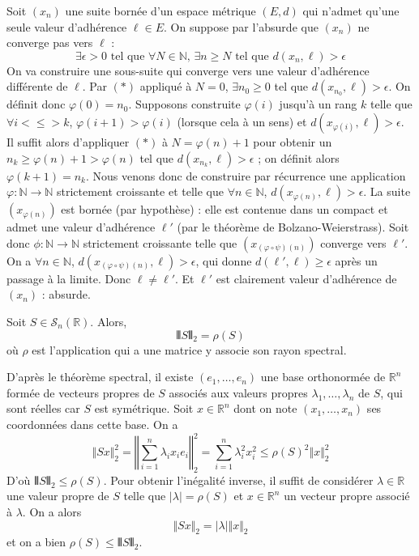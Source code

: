 	\begin{demonstration}
		Soit $(x_n)$ une suite bornée d'un espace métrique $(E, d)$ qui n'admet qu'une seule valeur d'adhérence $\ell \in E$. On suppose par l'absurde que $(x_n)$ ne converge pas vers $\ell$ :
		\[ \exists \epsilon > 0 \text{ tel que } \forall N \in \mathbb{N}, \, \exists n \geq N \text{ tel que } d(x_n, \ell) > \epsilon \tag{$*$} \]
		On va construire une sous-suite qui converge vers une valeur d'adhérence différente de $\ell$.
		\newpar
		Par $(*)$ appliqué à $N = 0$, $\exists n_0 \geq 0$ tel que $d(x_{n_0}, \ell) > \epsilon$. On définit donc $\varphi(0) = n_0$.
		\newpar
		Supposons construite $\varphi(i)$ jusqu'à un rang $k$ telle que $\forall i <\leq> k$, $\varphi(i+1) > \varphi(i)$ (lorsque cela à un sens) et $d(x_{\varphi(i)}, \ell) > \epsilon$. Il suffit alors d'appliquer $(*)$ à $N = \varphi(n) + 1$ pour obtenir un $n_k \geq \varphi(n) + 1 > \varphi(n)$ tel que $d(x_{n_k}, \ell) > \epsilon$ ; on définit alors $\varphi(k+1) = n_k$.
		\newpar
		Nous venons donc de construire par récurrence une application $\varphi : \mathbb{N} \rightarrow \mathbb{N}$ strictement croissante et telle que $\forall n \in \mathbb{N}$, $d(x_{\varphi(n)}, \ell) > \epsilon$. La suite $(x_{\varphi(n)})$ est bornée (par hypothèse) : elle est contenue dans un compact et admet une valeur d'adhérence $\ell'$ (par le théorème de Bolzano-Weierstrass). Soit donc $\phi : \mathbb{N} \rightarrow \mathbb{N}$ strictement croissante telle que $(x_{(\varphi \circ \psi)(n)})$ converge vers $\ell'$.
		\newpar
		On a $\forall n \in \mathbb{N}$, $d(x_{(\varphi \circ \psi)(n)}, \ell) > \epsilon$, qui donne $d(\ell', \ell) \geq \epsilon$ après un passage à la limite. Donc $\ell \neq \ell'$.	Et $\ell'$ est clairement valeur d'adhérence de $(x_n)$ : absurde.
	\end{demonstration}

	\reference[I-P]{182}

	\begin{lemma}
		\label{homeomorphisme-de-l-exponentielle-3}
		Soit $S \in \mathcal{S}_n(\mathbb{R})$. Alors,
		\[ \VERT S \VERT_2 = \rho(S) \]
		où $\rho$ est l'application qui a une matrice y associe son rayon spectral.
	\end{lemma}

	\begin{demonstration}
		D'après le théorème spectral, il existe $(e_1, \dots, e_n)$ une base orthonormée de $\mathbb{R}^n$ formée de vecteurs propres de $S$ associés aux valeurs propres $\lambda_1, \dots, \lambda_n$ de $S$, qui sont réelles car $S$ est symétrique. Soit $x \in \mathbb{R}^n$ dont on note $(x_1, \dots, x_n)$ ses coordonnées dans cette base. On a
		\[ \Vert Sx \Vert_2^2 = \left \Vert \sum_{i=1}^{n} \lambda_i x_i e_i \right \Vert_2^2 = \sum_{i=1}^n \lambda_i^2 x_i^2 \leq \rho(S)^2 \Vert x \Vert_2^2 \]
		D'où $\VERT S \VERT_2 \leq \rho(S)$. Pour obtenir l'inégalité inverse, il suffit de considérer $\lambda \in \mathbb{R}$ une valeur propre de $S$ telle que $|\lambda| = \rho(S)$ et $x \in \mathbb{R}^n$ un vecteur propre associé à $\lambda$. On a alors
		\[ \Vert Sx \Vert_2 = |\lambda| \Vert x \Vert_2 \]
		et on a bien $\rho(S) \leq \VERT S \VERT_2$.
	\end{demonstration}


